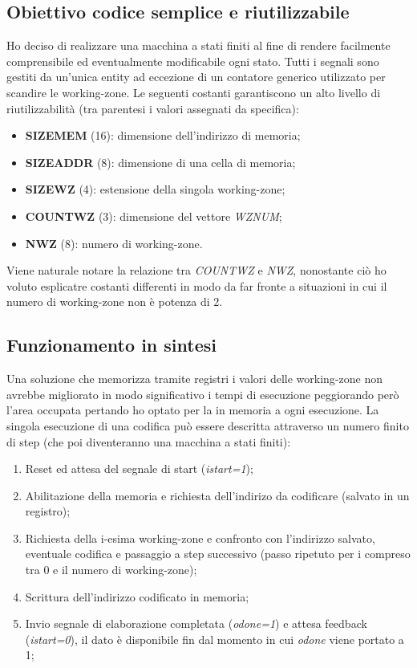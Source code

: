 \documentclass{article}
\begin{document}
\subsection{Obiettivo codice semplice e riutilizzabile}
Ho deciso di realizzare una macchina a stati finiti al fine di rendere facilmente comprensibile ed eventualmente modificabile ogni stato.
Tutti i segnali sono gestiti da un'unica entity ad eccezione di un contatore generico utilizzato per scandire le working-zone.
Le seguenti costanti garantiscono un alto livello di riutilizzabilità (tra parentesi i valori assegnati da specifica):
\begin{itemize}
	\item \textbf{SIZE\textunderscore MEM} (16): dimensione dell'indirizzo di memoria;
	\item \textbf{SIZE\textunderscore ADDR} (8): dimensione di una cella di memoria;
	\item \textbf{SIZE\textunderscore WZ} (4): estensione della singola working-zone;
	\item \textbf{COUNT\textunderscore WZ} (3): dimensione del vettore \textit{WZ\textunderscore NUM};
	\item \textbf{N\textunderscore WZ} (8): numero di working-zone.
\end{itemize}
Viene naturale notare la relazione tra \textit{COUNT\textunderscore WZ} e \textit{N\textunderscore WZ}, nonostante ciò ho voluto esplicatre costanti differenti in modo da far fronte a situazioni in cui il numero di working-zone non è potenza di 2.
\subsection{Funzionamento in sintesi}
Una soluzione che memorizza tramite registri i valori delle working-zone non avrebbe migliorato in modo significativo i tempi di esecuzione peggiorando però l'area occupata pertando ho optato per la  in memoria a ogni esecuzione.
La singola esecuzione di una codifica può essere descritta attraverso un numero finito di step (che poi diventeranno una macchina a stati finiti):
\begin{enumerate}
	\item Reset ed attesa del segnale di start (\textit{i\textunderscore start=1});
	\item Abilitazione della memoria e richiesta dell'indirizo da codificare (salvato in un registro);
	\item Richiesta della i-esima working-zone e confronto con l'indirizzo salvato, eventuale codifica e passaggio a step successivo (passo ripetuto per i compreso tra 0 e il numero di working-zone);
	\item Scrittura dell'indirizzo codificato in memoria;
	\item Invio segnale di elaborazione completata (\textit{o\textunderscore done=1}) e attesa feedback (\textit{i\textunderscore start=0}), il dato è disponibile fin dal momento in cui \textit{o\textunderscore done} viene portato a 1;
\end{enumerate}
\end{document}
